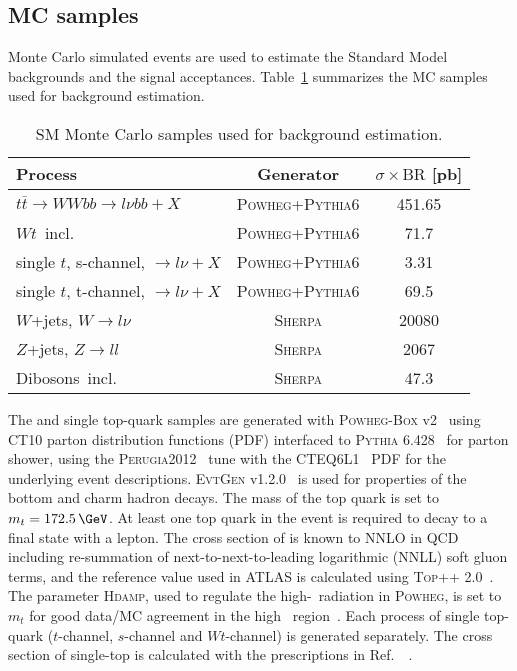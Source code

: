 \subsection{MC samples}
Monte Carlo simulated events are used to estimate the Standard Model backgrounds and the signal acceptances. Table~\ref{tabular:mc_samples} summarizes the MC samples used for background estimation.
\begin{table}[!h]

\label{tabular:mc_samples}
\begin{center}
\begin{tabular}{|l|c|c|}
  \hline
 Process & Generator       & $\sigma\times\text{BR}$ [pb]  \\ 
\hline

$t\bar{t} \to WWbb \to l \nu bb + X$ & \textsc{Powheg+Pythia6} & 451.65 \\
$Wt$~incl. & \textsc{Powheg+Pythia6} & 71.7 \\
single $t$,  s-channel, $\to l \nu + X$  & \textsc{Powheg+Pythia6} & 3.31 \\ 
single $t$,  t-channel, $\to l \nu + X$  & \textsc{Powheg+Pythia6} & 69.5 \\ 
$W$+jets, $W \to l \nu$ & \textsc{Sherpa} & 20080 \\
$Z$+jets, $Z \to l l$ & \textsc{Sherpa} & 2067 \\
Dibosons~incl. & \textsc{Sherpa} & 47.3 \\
\hline
\end{tabular}
\end{center}
\caption{SM Monte Carlo samples used for background estimation.}
\end{table}
The \ttbar and single top-quark samples are generated with \textsc{Powheg-Box} v2~\cite{Frixione:2007vw} using \textsc{CT10} parton distribution functions (PDF) interfaced to \textsc{Pythia} 6.428~\cite{Sjostrand:2006za} for parton shower, using the \textsc{Perugia2012}~\cite{Skands:2010ak} tune with the CTEQ6L1~\cite{Pumplin:2002vw} PDF for the underlying event descriptions. \textsc{EvtGen} v1.2.0~\cite{Lange:2001uf} is used for properties of the bottom and charm hadron decays. The mass of the top quark is set to $m_{t} = 172.5\,\GeV$. At least one top quark in the \ttbar event is required to decay to a final state with a lepton. The cross section of \ttbar is known to NNLO in QCD including re-summation of next-to-next-to-leading logarithmic (NNLL) soft gluon terms, and the reference value used in ATLAS is calculated using \textsc{Top++} 2.0~\cite{Czakon:2011xx}. The parameter \textsc{Hdamp}, used to regulate the high-\pt\ radiation in \textsc{Powheg}, is set to $m_{t}$ for good data/MC
agreement in the high \pt\ region~\cite{ATL-PHYS-PUB-2014-005}. Each process of single top-quark ($t$-channel, $s$-channel and $Wt$-channel) is generated separately. The cross section of single-top is calculated with the prescriptions in Ref.~~\cite{Kidonakis:2011wy, Kidonakis:2010ux}. 

